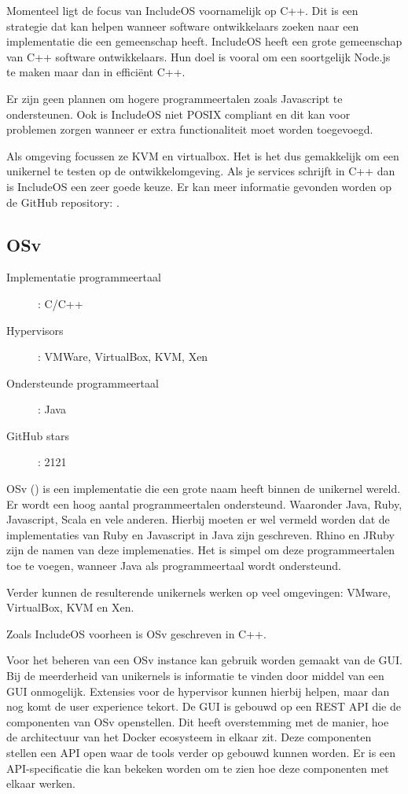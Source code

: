 Momenteel ligt de focus van IncludeOS voornamelijk op C++. Dit is een strategie dat kan helpen wanneer software ontwikkelaars zoeken naar een implementatie die een gemeenschap heeft. IncludeOS heeft een grote gemeenschap van C++ software ontwikkelaars. Hun doel is vooral om een soortgelijk Node.js te maken maar dan in efficiënt C++.

Er zijn geen plannen om hogere programmeertalen zoals Javascript te ondersteunen. Ook is IncludeOS niet POSIX compliant en dit kan voor problemen zorgen wanneer er extra functionaliteit moet worden toegevoegd.

Als omgeving focussen ze KVM en virtualbox. Het is het dus gemakkelijk om een unikernel te testen op de ontwikkelomgeving. Als je services schrijft in C++ dan is IncludeOS een zeer goede keuze. Er kan meer informatie gevonden worden op de GitHub repository: \cite{oslo_and_akershus_university_college_hioa-cs/includeos_????}.

\subsection{OSv}

\begin{description}
  \item [Implementatie programmeertaal]: C/C++
  \item [Hypervisors]: VMWare, VirtualBox, KVM, Xen
  \item [Ondersteunde programmeertaal]: Java
  \item [GitHub stars]: 2121
\end{description}

OSv (\cite{cloudius-systems/osv_0000}) is een implementatie die een grote naam heeft binnen de unikernel wereld. Er wordt een hoog aantal programmeertalen ondersteund. Waaronder Java, Ruby, Javascript, Scala en vele anderen. Hierbij moeten er wel vermeld worden dat de implementaties van Ruby en Javascript in Java zijn geschreven. Rhino en JRuby zijn de namen van deze implemenaties. Het is simpel om deze programmeertalen toe te voegen, wanneer Java als programmeertaal wordt ondersteund.

Verder kunnen de resulterende unikernels werken op veel omgevingen: VMware, VirtualBox, KVM en Xen.

Zoals IncludeOS voorheen is OSv geschreven in C++.

Voor het beheren van een OSv instance kan gebruik worden gemaakt van de GUI. Bij de meerderheid van unikernels is informatie te vinden door middel van een GUI onmogelijk. Extensies voor de hypervisor kunnen hierbij helpen, maar dan nog komt de user experience tekort. De GUI is gebouwd op een REST API die de componenten van OSv openstellen. Dit heeft overstemming met de manier, hoe de architectuur van het Docker ecosysteem in elkaar zit. Deze componenten stellen een API open waar de tools verder op gebouwd kunnen worden. Er is een API-specificatie die kan bekeken worden om te zien hoe deze componenten met elkaar werken.

